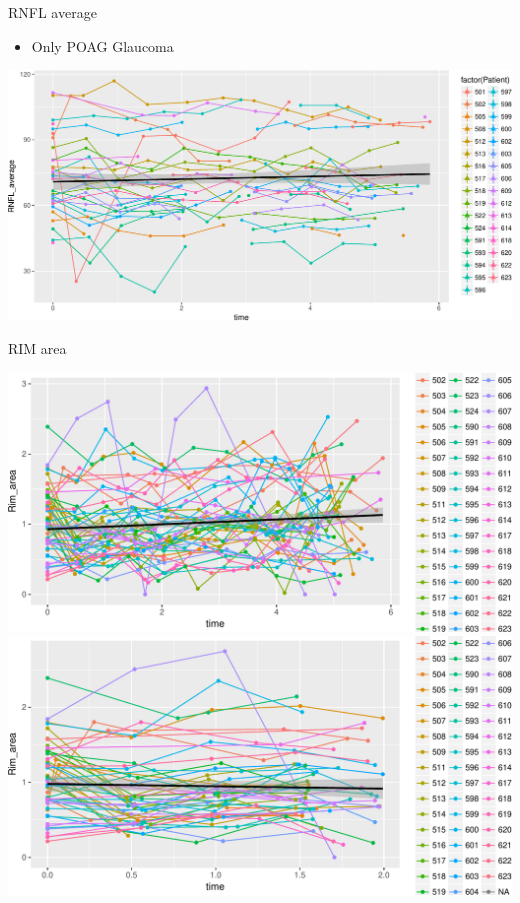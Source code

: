 \documentclass[ignorenonframetext,]{beamer}
\providecommand{\tightlist}{%
  \setlength{\itemsep}{0pt}\setlength{\parskip}{0pt}}
\begin{document}
\begin{frame}{RNFL average}

\begin{itemize}
\tightlist
\item
  Only POAG Glaucoma
\end{itemize}

\includegraphics{analisi_exp_markdown_files/figure-beamer/unnamed-chunk-11-1.pdf}

\end{frame}

\begin{frame}{RIM area}

\includegraphics{analisi_exp_markdown_files/figure-beamer/unnamed-chunk-12-1.pdf}
\includegraphics{analisi_exp_markdown_files/figure-beamer/unnamed-chunk-12-2.pdf}

\end{frame}
\end{document}
